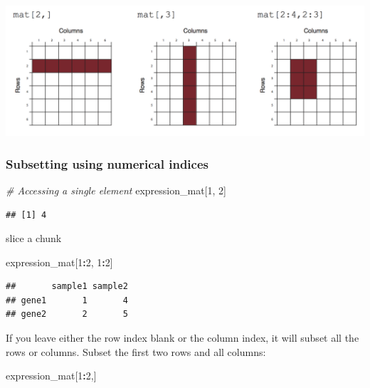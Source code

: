 \documentclass[
]{book}
\newenvironment{Shaded}{\begin{snugshade}}{\end{snugshade}}
\newcommand{\CommentTok}[1]{\textcolor[rgb]{0.56,0.35,0.01}{\textit{#1}}}
\newcommand{\DecValTok}[1]{\textcolor[rgb]{0.00,0.00,0.81}{#1}}
\newcommand{\NormalTok}[1]{#1}
\newcommand{\SpecialCharTok}[1]{\textcolor[rgb]{0.81,0.36,0.00}{\textbf{#1}}}
\begin{document}
\includegraphics{images/matrix.png}

\hypertarget{subsetting-using-numerical-indices}{%
\subsubsection{Subsetting using numerical indices}\label{subsetting-using-numerical-indices}}

\begin{Shaded}
\begin{Highlighting}[]
\CommentTok{\# Accessing a single element}
\NormalTok{expression\_mat[}\DecValTok{1}\NormalTok{, }\DecValTok{2}\NormalTok{]}
\end{Highlighting}
\end{Shaded}

\begin{verbatim}
## [1] 4
\end{verbatim}

slice a chunk

\begin{Shaded}
\begin{Highlighting}[]
\NormalTok{expression\_mat[}\DecValTok{1}\SpecialCharTok{:}\DecValTok{2}\NormalTok{, }\DecValTok{1}\SpecialCharTok{:}\DecValTok{2}\NormalTok{]}
\end{Highlighting}
\end{Shaded}

\begin{verbatim}
##       sample1 sample2
## gene1       1       4
## gene2       2       5
\end{verbatim}

If you leave either the row index blank or the column index, it will subset all the rows or columns. Subset the first two rows and all columns:

\begin{Shaded}
\begin{Highlighting}[]
\NormalTok{expression\_mat[}\DecValTok{1}\SpecialCharTok{:}\DecValTok{2}\NormalTok{,]}
\end{Highlighting}
\end{Shaded}
\end{document}
